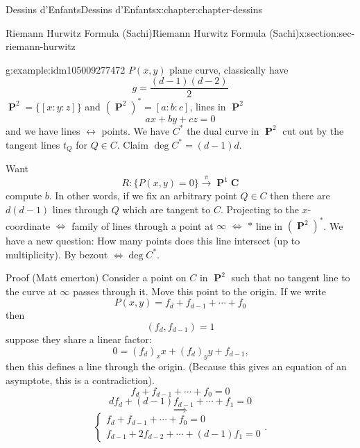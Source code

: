 \documentclass[oneside,10pt,]{book}
\numberwithin{equation}{section}
\newcommand{\lb}{[}
\newcommand{\rb}{]}
\newcommand{\CC}{\mathbf{C}}
\DeclareMathOperator{\PP}{\mathbf{P}}
\begin{document}
\begin{chapterptx}{Dessins d'Enfants}{}{Dessins d'Enfants}{}{}{x:chapter:chapter-dessins}
\begin{sectionptx}{Riemann Hurwitz Formula (Sachi)}{}{Riemann Hurwitz Formula (Sachi)}{}{}{x:section:sec-riemann-hurwitz}
\begin{example}{}{g:example:idm105009277472}%
\(P(x,y)\) plane curve, classically have%
\begin{equation*}
g = \frac{(d-1)(d-2)}{2}
\end{equation*}
\(\PP^2 = \{ \lb x:y:z \rb\}\) and \((\PP^2)^* = \lb a:b:c \rb\), lines in \(\PP^2\)%
\begin{equation*}
ax + by + cz = 0
\end{equation*}
and we have lines \(\leftrightarrow\) points. We have \(C^*\) the dual curve in \(\PP^2\) cut out by the tangent lines \(t_Q\) for \(Q \in C\). Claim \(\deg C^* = (d-1)d\).%
\par
Want%
\begin{equation*}
R:\{P(x,y) = 0\} \xrightarrow\pi \PP^1\CC
\end{equation*}
compute \(b\). In other words, if we fix an arbitrary point \(Q\in C\) then there are \(d(d-1)\) lines through \(Q\) which are tangent to \(C\). Projecting to the \(x\)-coordinate \(\iff\) family of lines through a point at \(\infty\) \(\iff\) \(\ast\) line in \((\PP^2)^*\). We have a new question: How many points does this line intersect (up to multiplicity). By bezout \(\iff  \deg C^*\).%
\par
Proof (Matt emerton) Consider a point on \(C\) in \(\PP^2\) such that no tangent line to the curve at   \(\infty\) passes through it. Move this point to the origin. If we write%
\begin{equation*}
P(x,y) = f_d + f_{d-1} + \cdots + f_0
\end{equation*}
then%
\begin{equation*}
(f_d, f_{d-1}) = 1
\end{equation*}
suppose they share a linear factor:%
\begin{equation*}
0 = (f_d)_x x + (f_d)_y y + f_{d-1}\text{,}
\end{equation*}
then this defines a line through the origin. (Because this gives an equation of an asymptote, this is a contradiction).%
\begin{equation*}
f_d + f_{d-1} + \cdots + f_0 = 0
\end{equation*}
%
\begin{equation*}
d f_d + (d-1) f_{d-1} + \cdots + f_1 = 0
\end{equation*}
%
\begin{equation*}
\implies
\end{equation*}
%
\begin{equation*}
\begin{cases}  f_d + f_{d-1} + \cdots + f_0 = 0 \\ f_{d-1} + 2f_{d-2} + \cdots + (d-1) f_1 = 0\end{cases}\text{.}

\end{equation*}
\end{example}
\end{sectionptx}
\end{chapterptx}
\end{document}
